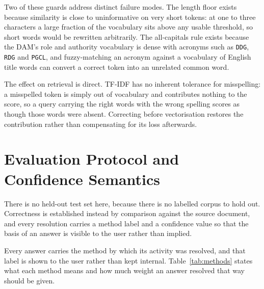 Two of these guards address distinct failure modes. The length floor exists because
similarity is close to uninformative on very short tokens: at one to three characters a large
fraction of the vocabulary sits above any usable threshold, so short words would be rewritten
arbitrarily. The all-capitals rule exists because the DAM's role and authority vocabulary is
dense with acronyms such as \texttt{DDG}, \texttt{RDG} and \texttt{PGCL}, and fuzzy-matching
an acronym against a vocabulary of English title words can convert a correct token into an
unrelated common word.

The effect on retrieval is direct. TF-IDF has no inherent tolerance for misspelling: a
misspelled token is simply out of vocabulary and contributes nothing to the score, so a query
carrying the right words with the wrong spelling scores as though those words were absent.
Correcting before vectorisation restores the contribution rather than compensating for its
loss afterwards.

\section{Evaluation Protocol and Confidence Semantics}

There is no held-out test set here, because there is no labelled corpus to hold out. Correctness is established instead by comparison against the source document, and every resolution carries a method label and a confidence value so that the basis of an answer is visible to the user rather than implied.

Every answer carries the method by which its activity was resolved, and that label is shown to the user rather than kept internal. Table~\ref{tab:methods} states what each method means and how much weight an answer resolved that way should be given.

